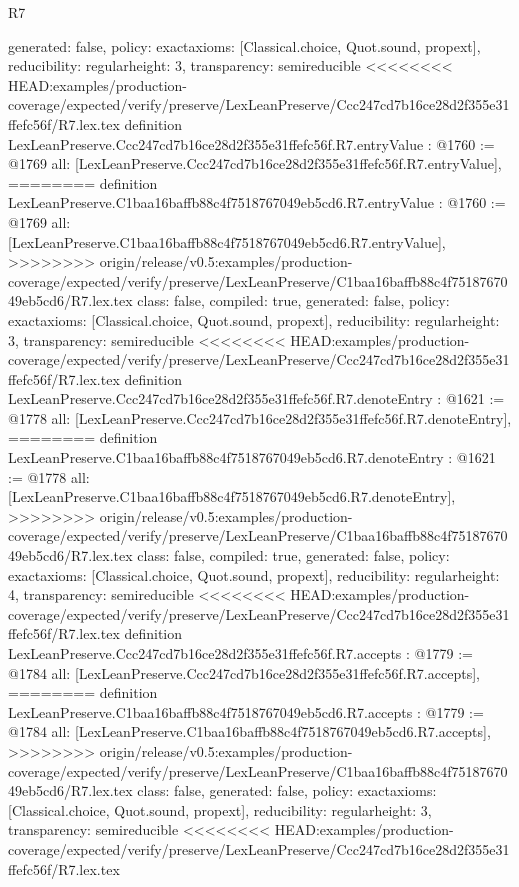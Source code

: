 \begin{lexlean}{R7}
\begin{coremodule}
{{{{{{{{{{{{{{{  generated: false,
  policy: exact{axioms: [Classical.choice, Quot.sound, propext]},
  reducibility: regular{height: 3},
  transparency: semireducible
}
<<<<<<<< HEAD:examples/production-coverage/expected/verify/preserve/LexLeanPreserve/Ccc247cd7b16ce28d2f355e31ffefc56f/R7.lex.tex
definition LexLeanPreserve.Ccc247cd7b16ce28d2f355e31ffefc56f.R7.entryValue : @1760 := @1769 {
  all: [LexLeanPreserve.Ccc247cd7b16ce28d2f355e31ffefc56f.R7.entryValue],
========
definition LexLeanPreserve.C1baa16baffb88c4f7518767049eb5cd6.R7.entryValue : @1760 := @1769 {
  all: [LexLeanPreserve.C1baa16baffb88c4f7518767049eb5cd6.R7.entryValue],
>>>>>>>> origin/release/v0.5:examples/production-coverage/expected/verify/preserve/LexLeanPreserve/C1baa16baffb88c4f7518767049eb5cd6/R7.lex.tex
  class: false,
  compiled: true,
  generated: false,
  policy: exact{axioms: [Classical.choice, Quot.sound, propext]},
  reducibility: regular{height: 3},
  transparency: semireducible
}
<<<<<<<< HEAD:examples/production-coverage/expected/verify/preserve/LexLeanPreserve/Ccc247cd7b16ce28d2f355e31ffefc56f/R7.lex.tex
definition LexLeanPreserve.Ccc247cd7b16ce28d2f355e31ffefc56f.R7.denoteEntry : @1621 := @1778 {
  all: [LexLeanPreserve.Ccc247cd7b16ce28d2f355e31ffefc56f.R7.denoteEntry],
========
definition LexLeanPreserve.C1baa16baffb88c4f7518767049eb5cd6.R7.denoteEntry : @1621 := @1778 {
  all: [LexLeanPreserve.C1baa16baffb88c4f7518767049eb5cd6.R7.denoteEntry],
>>>>>>>> origin/release/v0.5:examples/production-coverage/expected/verify/preserve/LexLeanPreserve/C1baa16baffb88c4f7518767049eb5cd6/R7.lex.tex
  class: false,
  compiled: true,
  generated: false,
  policy: exact{axioms: [Classical.choice, Quot.sound, propext]},
  reducibility: regular{height: 4},
  transparency: semireducible
}
<<<<<<<< HEAD:examples/production-coverage/expected/verify/preserve/LexLeanPreserve/Ccc247cd7b16ce28d2f355e31ffefc56f/R7.lex.tex
definition LexLeanPreserve.Ccc247cd7b16ce28d2f355e31ffefc56f.R7.accepts : @1779 := @1784 {
  all: [LexLeanPreserve.Ccc247cd7b16ce28d2f355e31ffefc56f.R7.accepts],
========
definition LexLeanPreserve.C1baa16baffb88c4f7518767049eb5cd6.R7.accepts : @1779 := @1784 {
  all: [LexLeanPreserve.C1baa16baffb88c4f7518767049eb5cd6.R7.accepts],
>>>>>>>> origin/release/v0.5:examples/production-coverage/expected/verify/preserve/LexLeanPreserve/C1baa16baffb88c4f7518767049eb5cd6/R7.lex.tex
  class: false,
  generated: false,
  policy: exact{axioms: [Classical.choice, Quot.sound, propext]},
  reducibility: regular{height: 3},
  transparency: semireducible
}
<<<<<<<< HEAD:examples/production-coverage/expected/verify/preserve/LexLeanPreserve/Ccc247cd7b16ce28d2f355e31ffefc56f/R7.lex.tex
}}}}}}}}}}}}}}}}}
\end{coremodule}
\end{lexlean}
